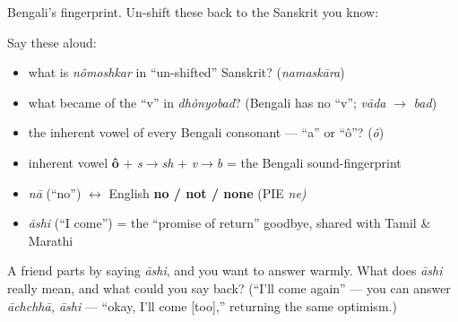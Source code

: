 \begin{grammarlens}[title={Grammar lens — the one habit}]
Bengali's fingerprint. Un-shift these back to the Sanskrit you know:

Say these aloud:

\begin{itemize}
\raggedright
  \item what is \emph{nômoshkar} in \textquotedblleft{}un-shifted\textquotedblright{} Sanskrit? (\emph{namaskāra})
  \item what became of the \textquotedblleft{}v\textquotedblright{} in \emph{dhônyobad}? (Bengali has no \textquotedblleft{}v\textquotedblright{}; \emph{vāda} $\to$ \emph{bad})
  \item the inherent vowel of every Bengali consonant — \textquotedblleft{}a\textquotedblright{} or \textquotedblleft{}ô\textquotedblright{}? (\emph{ô})
\end{itemize}
\end{grammarlens}

\begin{grammarlens}[title={What you've built — roots you now carry}]
\begin{itemize}
\raggedright
  \item inherent vowel \textbf{ô} + \emph{s$\to$sh} + \emph{v$\to$b} = the Bengali sound-fingerprint
  \item \emph{nā} (\textquotedblleft{}no\textquotedblright{}) $\leftrightarrow$ English \textbf{no / not / none} (PIE \emph{ne)}
  \item \emph{āshi} (\textquotedblleft{}I come\textquotedblright{}) = the \textquotedblleft{}promise of return\textquotedblright{} goodbye, shared with Tamil \& Marathi
\end{itemize}
\end{grammarlens}

\begin{tcolorbox}[breakable,colback=teal!4,colframe=teal!35!black,title={Before you move on}]
A friend parts by saying \emph{āshi}, and you want to answer warmly. What does \emph{āshi} really mean, and what could you say back? (\textquotedblleft{}I'll come again\textquotedblright{} — you can answer \emph{āchchhā, āshi} — \textquotedblleft{}okay, I'll come {[}too{]},\textquotedblright{} returning the same optimism.)
\end{tcolorbox}
